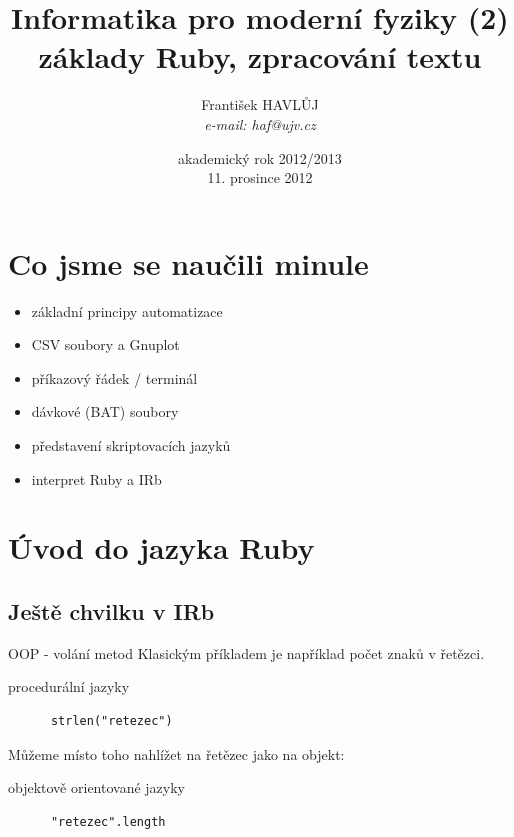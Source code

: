 \documentclass{beamer}
\title[IMF (2)]{Informatika pro moderní fyziky (2)\\základy Ruby, zpracování textu}
\author[Franti\v{s}ek HAVL\r{U}J, ORF ÚJV Řež]{Franti\v{s}ek HAVL\r{U}J\\{\scriptsize \emph{e-mail: haf@ujv.cz}}}
\date{akademický rok 2012/2013\\11. prosince 2012}
\institute[ORF ÚJV Řež]
{ÚJV Řež\\oddělení Reaktorové fyziky a podpory palivového cyklu}
\begin{document}
\begin{frame}
  \titlepage
\end{frame}

\begin{frame}
  \tableofcontents
\end{frame}

\section{Co jsme se naučili minule}

\begin{frame}{}
  \begin{itemize}
    \item základní principy automatizace
    \item CSV soubory a Gnuplot
    \item příkazový řádek / terminál
    \item dávkové (BAT) soubory
    \item představení skriptovacích jazyků
    \item interpret Ruby a IRb
  \end{itemize}
\end{frame}


\section{Úvod do jazyka Ruby}

\subsection{Ještě chvilku v IRb}

\begin{frame}[fragile]{OOP - volání metod}
  Klasickým příkladem je například počet znaků v řetězci.
  \begin{block}{procedurální jazyky}
    \begin{verbatim}
      strlen("retezec")
    \end{verbatim}
  \end{block}
  \pause
  Můžeme místo toho nahlížet na řetězec jako na objekt:
  \pause
  \begin{block}{objektově orientované jazyky}
    \begin{verbatim}
      "retezec".length
    \end{verbatim}
  \end{block}
\end{frame}
\end{document}
